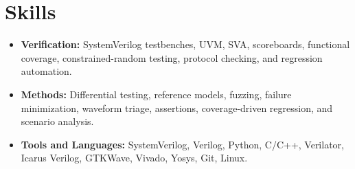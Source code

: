 \documentclass[10pt,letterpaper]{article}
\newcommand{\resumeItem}[1]{\item #1}
\newenvironment{resumeItemList}{\begin{small}\begin{itemize}[leftmargin=*, itemsep=2pt, topsep=3pt, parsep=0pt]}{\end{itemize}\end{small}\vspace{4pt}}
\begin{document}
\section*{Skills}
\begin{resumeItemList}
    \resumeItem{\textbf{Verification:} SystemVerilog testbenches, UVM, SVA, scoreboards, functional coverage, constrained-random testing, protocol checking, and regression automation.}
    \resumeItem{\textbf{Methods:} Differential testing, reference models, fuzzing, failure minimization, waveform triage, assertions, coverage-driven regression, and scenario analysis.}
    \resumeItem{\textbf{Tools and Languages:} SystemVerilog, Verilog, Python, C/C++, Verilator, Icarus Verilog, GTKWave, Vivado, Yosys, Git, Linux.}
\end{resumeItemList}
\end{document}

